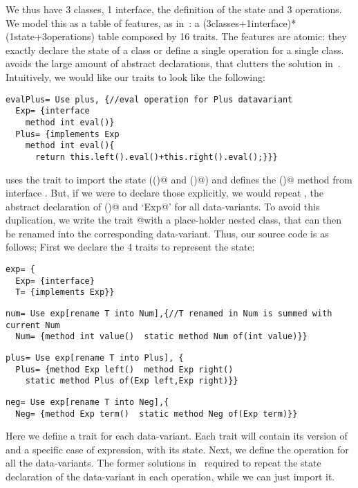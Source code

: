 We thus have 3 classes, 1 interface,
the definition of the state and 3 operations.
We model this
as a table of features, as in~\cite{deep}:
a (3classes+1interface)*(1state+3operations)
table composed by 16 traits.
The features are atomic: they exactly 
declare the state of a class
or define a single operation for a single class.
\name avoids the large amount of abstract declarations,
that clutters the solution in~\cite{deep}.
Intuitively, we would like our traits to look like the following:
\begin{lstlisting}
evalPlus= Use plus, {//eval operation for Plus datavariant
  Exp= {interface
    method int eval()}
  Plus= {implements Exp
    method int eval(){
      return this.left().eval()+this.right().eval();}}}
\end{lstlisting}
\Q@evalPlus@ uses the trait \Q@plus@ to import the state (\Q@left()@ and \Q@right()@)
and defines the \Q@eval()@ method from interface \Q@Exp@.
But, if we were to declare those
explicitly, we would repeat \Q@Exp@, the abstract
declaration of \Q@eval()@ and `\Q@implements Exp@'
for all data-variants.
To avoid this duplication,  we write 
the trait \Q@eval @with a place-holder \Q@T@ nested class, that can then be renamed
into the corresponding data-variant.
Thus, our source code is as follows;
First we declare the 4 traits to represent the state:
\newcommand\multiCode{\vspace{-5pt}}
\saveSpace
\begin{lstlisting}
exp= {
  Exp= {interface}
  T= {implements Exp}}
\end{lstlisting}
\multiCode
\begin{lstlisting}
num= Use exp[rename T into Num],{//T renamed in Num is summed with current Num
  Num= {method int value()  static method Num of(int value)}}
\end{lstlisting}
\multiCode
\begin{lstlisting}
plus= Use exp[rename T into Plus], {
  Plus= {method Exp left()  method Exp right()
    static method Plus of(Exp left,Exp right)}}
\end{lstlisting}
\multiCode
\begin{lstlisting}
neg= Use exp[rename T into Neg],{
  Neg= {method Exp term()  static method Neg of(Exp term)}}
\end{lstlisting}
Here we define a trait for each data-variant.
Each trait will contain its version of \Q@Exp@
and a specific case of expression, with its state.
Next, we define the operation \Q@eval@ for all the data-variants.
The former solutions in~\cite{deep}
required to repeat the state declaration of the 
data-variant in each operation, while we can just import it.

